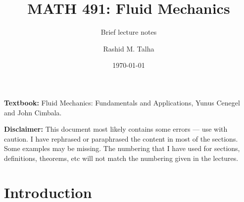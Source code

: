 \documentclass[11pt]{penrose}
\title{MATH 491: Fluid Mechanics}
\subtitle{Brief lecture notes}
\author{Rashid M. Talha}
\affiliation{School of Natural Sciences, NUST}
\date{\today}
\begin{document}
\maketitle

\textbf{Textbook:} Fluid Mechanics: Fundamentals and Applications, Yunus Cenegel and John Cimbala.

\textbf{Disclaimer:} This document most likely contains some errors --- use with caution. I have rephrased or paraphrased the content in most of the sections. Some examples may be missing. The numbering that I have used for sections, definitions, theorems, etc will not match the numbering given in the lectures.

\section{Introduction}




\end{document}
